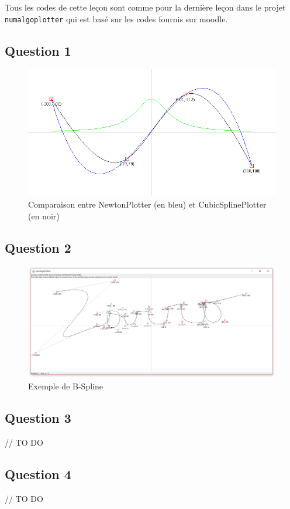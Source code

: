 Tous les codes de cette leçon sont comme pour la dernière leçon dans le projet \texttt{numalgoplotter} qui est basé sur les codes fournis sur moodle. 

\subsection{Question 1}

\begin{figure}[H]
	\centering
	\caption{\label{comparaison} Comparaison entre NewtonPlotter (en bleu) et CubicSplinePlotter (en noir)}
	\includegraphics[scale = 0.4]{7_comparaisonNewtonCubic.png}
\end{figure}

\subsection{Question 2}


\begin{figure}[H]
	\caption{\label{7_zorro} Exemple de B-Spline}
	\centering
	\includegraphics[scale = 0.3]{7_zorro.png}
\end{figure}

\subsection{Question 3}

// TO DO


\subsection{Question 4}

// TO DO